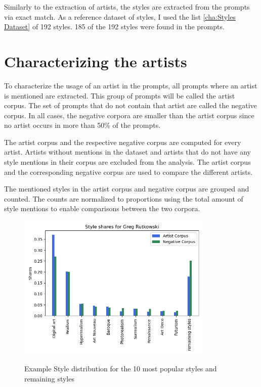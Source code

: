 Similarly to the extraction of artists, the styles are extracted from the prompts via exact match. As a reference dataset of styles, I used the list \ref{cha:Styles Dataset} of 192 styles. 185 of the 192 styles were found in the prompts.




\section{Characterizing the artists}

To characterize the usage of an artist in the prompts, all prompts where an artist is mentioned are extracted. This group of prompts will be called the artist corpus.
The set of prompts that do not contain that artist are called the negative corpus. In all cases, the negative corpora are smaller than the artist corpus since no artist occurs in more than 50\% of the prompts.

The artist corpus and the respective negative corpus are computed for every artist. Artists without mentions in the dataset and artists that do not have any style mentions in their corpus are excluded from the analysis. The artist corpus and the corresponding negative corpus are used to compare the different artists.

The mentioned styles in the artist corpus and negative corpus are grouped and counted. The counts are normalized to proportions using the total amount of style mentions to enable comparisons between the two corpora.

\begin{figure}[h]
    \begin{center}
        \includegraphics[height=7cm]{Bilder/style_proportions_example.png}\\[2.5ex]
    \end{center}
\caption{Example Style distribution for the 10 most popular styles and remaining styles}
\end{figure}


